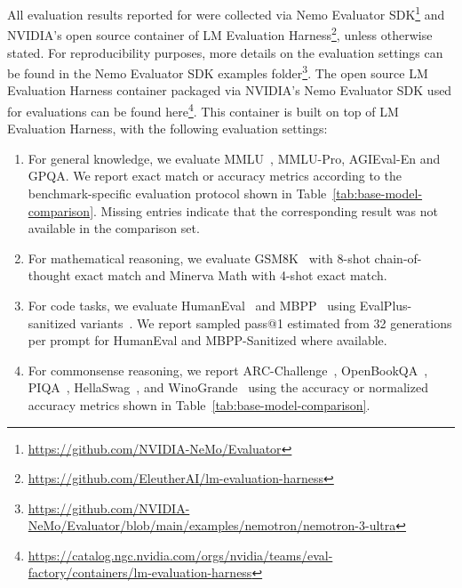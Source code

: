 All evaluation results reported for \ourbasemodel were collected via Nemo Evaluator SDK\footnote{\url{https://github.com/NVIDIA-NeMo/Evaluator}} and NVIDIA's open source container of LM Evaluation Harness\footnote{\url{https://github.com/EleutherAI/lm-evaluation-harness}}, unless otherwise stated. For reproducibility purposes, more details on the evaluation settings can be found in the Nemo Evaluator SDK examples folder\footnote{\url{https://github.com/NVIDIA-NeMo/Evaluator/blob/main/examples/nemotron/nemotron-3-ultra}}.
The open source LM Evaluation Harness container packaged via NVIDIA's Nemo Evaluator SDK used for evaluations can be found here\footnote{\url{https://catalog.ngc.nvidia.com/orgs/nvidia/teams/eval-factory/containers/lm-evaluation-harness}}. This container is built on top of LM Evaluation Harness, with the following evaluation settings:
\begin{enumerate}

  \setlength{\itemsep}{0.4em}

    \item For general knowledge, we evaluate MMLU~\citep{hendrycks2021measuringmassivemultitasklanguage}, MMLU-Pro, AGIEval-En and GPQA. We report exact match or accuracy metrics according to the benchmark-specific evaluation protocol shown in Table~\ref{tab:base-model-comparison}. Missing entries indicate that the corresponding result was not available in the comparison set.

    \item For mathematical reasoning, we evaluate GSM8K~\citep{cobbe2021trainingverifierssolvemath} with 8-shot chain-of-thought exact match and Minerva Math with 4-shot exact match.

    \item For code tasks, we evaluate HumanEval~\citep{chen2021evaluatinglargelanguagemodels} and MBPP~\citep{austin2021programsynthesislargelanguage} using EvalPlus-sanitized variants~\citep{Liu_Is_Your_Code_2023}. We report sampled pass@1 estimated from 32 generations per prompt for HumanEval and MBPP-Sanitized where available.

    \item For commonsense reasoning, we report ARC-Challenge~\citep{Clark2018ThinkYH}, OpenBookQA~\citep{mihaylov2018suitarmorconductelectricity}, PIQA~\citep{bisk2019piqareasoningphysicalcommonsense}, HellaSwag~\citep{zellers2019hellaswagmachinereallyfinish}, and WinoGrande~\citep{sakaguchi2019winograndeadversarialwinogradschema} using the accuracy or normalized accuracy metrics shown in Table~\ref{tab:base-model-comparison}.


\end{enumerate}
